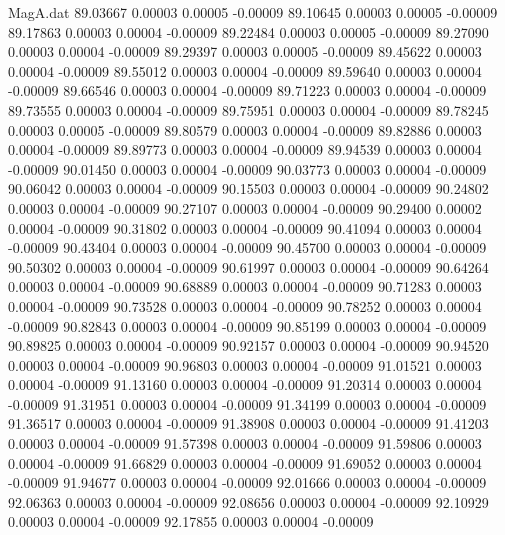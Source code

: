 \begin{filecontents}{MagA.dat}
  89.03667    0.00003    0.00005   -0.00009
  89.10645    0.00003    0.00005   -0.00009
  89.17863    0.00003    0.00004   -0.00009
  89.22484    0.00003    0.00005   -0.00009
  89.27090    0.00003    0.00004   -0.00009
  89.29397    0.00003    0.00005   -0.00009
  89.45622    0.00003    0.00004   -0.00009
  89.55012    0.00003    0.00004   -0.00009
  89.59640    0.00003    0.00004   -0.00009
  89.66546    0.00003    0.00004   -0.00009
  89.71223    0.00003    0.00004   -0.00009
  89.73555    0.00003    0.00004   -0.00009
  89.75951    0.00003    0.00004   -0.00009
  89.78245    0.00003    0.00005   -0.00009
  89.80579    0.00003    0.00004   -0.00009
  89.82886    0.00003    0.00004   -0.00009
  89.89773    0.00003    0.00004   -0.00009
  89.94539    0.00003    0.00004   -0.00009
  90.01450    0.00003    0.00004   -0.00009
  90.03773    0.00003    0.00004   -0.00009
  90.06042    0.00003    0.00004   -0.00009
  90.15503    0.00003    0.00004   -0.00009
  90.24802    0.00003    0.00004   -0.00009
  90.27107    0.00003    0.00004   -0.00009
  90.29400    0.00002    0.00004   -0.00009
  90.31802    0.00003    0.00004   -0.00009
  90.41094    0.00003    0.00004   -0.00009
  90.43404    0.00003    0.00004   -0.00009
  90.45700    0.00003    0.00004   -0.00009
  90.50302    0.00003    0.00004   -0.00009
  90.61997    0.00003    0.00004   -0.00009
  90.64264    0.00003    0.00004   -0.00009
  90.68889    0.00003    0.00004   -0.00009
  90.71283    0.00003    0.00004   -0.00009
  90.73528    0.00003    0.00004   -0.00009
  90.78252    0.00003    0.00004   -0.00009
  90.82843    0.00003    0.00004   -0.00009
  90.85199    0.00003    0.00004   -0.00009
  90.89825    0.00003    0.00004   -0.00009
  90.92157    0.00003    0.00004   -0.00009
  90.94520    0.00003    0.00004   -0.00009
  90.96803    0.00003    0.00004   -0.00009
  91.01521    0.00003    0.00004   -0.00009
  91.13160    0.00003    0.00004   -0.00009
  91.20314    0.00003    0.00004   -0.00009
  91.31951    0.00003    0.00004   -0.00009
  91.34199    0.00003    0.00004   -0.00009
  91.36517    0.00003    0.00004   -0.00009
  91.38908    0.00003    0.00004   -0.00009
  91.41203    0.00003    0.00004   -0.00009
  91.57398    0.00003    0.00004   -0.00009
  91.59806    0.00003    0.00004   -0.00009
  91.66829    0.00003    0.00004   -0.00009
  91.69052    0.00003    0.00004   -0.00009
  91.94677    0.00003    0.00004   -0.00009
  92.01666    0.00003    0.00004   -0.00009
  92.06363    0.00003    0.00004   -0.00009
  92.08656    0.00003    0.00004   -0.00009
  92.10929    0.00003    0.00004   -0.00009
  92.17855    0.00003    0.00004   -0.00009

\end{filecontents}
